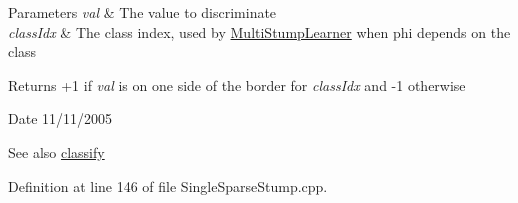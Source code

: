 \begin{DoxyParams}{Parameters}
{\em val} & The value to discriminate \\
\hline
{\em classIdx} & The class index, used by \hyperlink{classMultiBoost_1_1MultiStumpLearner}{MultiStumpLearner} when phi depends on the class \\
\hline
\end{DoxyParams}
\begin{DoxyReturn}{Returns}
+1 if {\itshape val\/} is on one side of the border for {\itshape classIdx\/} and -\/1 otherwise 
\end{DoxyReturn}
\begin{DoxyDate}{Date}
11/11/2005 
\end{DoxyDate}
\begin{DoxySeeAlso}{See also}
\hyperlink{classMultiBoost_1_1AbstainableLearner_aedcb9bae3cce79f1f8cfc2570698aa97}{classify} 
\end{DoxySeeAlso}


Definition at line 146 of file SingleSparseStump.cpp.

